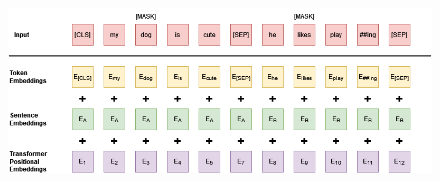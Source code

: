 \documentclass[sigconf,nonacm, 11pt]{acmart}
\begin{document}
\begin{figure}[h]
        \centering 
        \includegraphics [height=0.7\linewidth, angle=90]{resources/NextSentence.png} \\
        \caption{\citet{Devlin2019BERTPO}}
        \label{fig:next_sentence_large}
    \end{figure}
\end{document}
